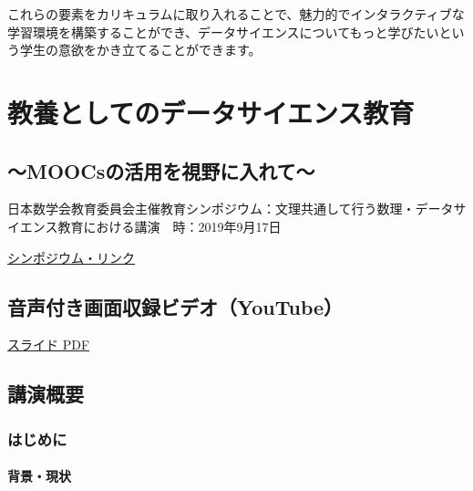 \documentclass[
]{book}
\theoremstyle{definition}
\theoremstyle{definition}
\theoremstyle{definition}
\theoremstyle{definition}
\theoremstyle{remark}
\begin{document}
これらの要素をカリキュラムに取り入れることで、魅力的でインタラクティブな学習環境を構築することができ、データサイエンスについてもっと学びたいという学生の意欲をかき立てることができます。

\hypertarget{appendix-appendix}{%
\appendix}


\hypertarget{math2019}{%
\chapter{教養としてのデータサイエンス教育}\label{math2019}}

\hypertarget{moocsux306eux6d3bux7528ux3092ux8996ux91ceux306bux5165ux308cux3066}{%
\section*{～MOOCsの活用を視野に入れて～}\label{moocsux306eux6d3bux7528ux3092ux8996ux91ceux306bux5165ux308cux3066}}

日本数学会教育委員会主催教育シンポジウム：文理共通して行う数理・データサイエンス教育における講演　時：2019年9月17日

\href{https://www.mathsoc.jp/overview/committee/education/sympo/2019sep.html}{シンポジウム・リンク}

\hypertarget{ux97f3ux58f0ux4ed8ux304dux753bux9762ux53ceux9332ux30d3ux30c7ux30aayoutube}{%
\section{音声付き画面収録ビデオ（YouTube）}\label{ux97f3ux58f0ux4ed8ux304dux753bux9762ux53ceux9332ux30d3ux30c7ux30aayoutube}}

\href{https://icu-hsuzuki.github.io/datascience/ed/msj2019.pdf}{スライド PDF}

\hypertarget{ux8b1bux6f14ux6982ux8981}{%
\section{講演概要}\label{ux8b1bux6f14ux6982ux8981}}

\hypertarget{ux306fux3058ux3081ux306b-1}{%
\subsection{はじめに}\label{ux306fux3058ux3081ux306b-1}}

\hypertarget{ux80ccux666fux73feux72b6}{%
\subsubsection{背景・現状}\label{ux80ccux666fux73feux72b6}}
\end{document}
